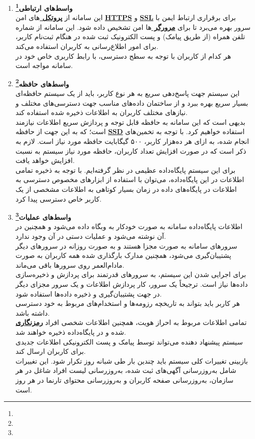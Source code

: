 \documentclass[12pt]{article}
\begin{document}
\begin{enumerate}
		\item
		\textbf{واسط‌های ارتباطی\footnote{}}\\
		این سامانه از \textbf{\hyperref[ref:protocol]{پروتکل }}‌های امن \textbf{\hyperref[ref:https]{HTTPS}} و \textbf{\hyperref[ref:ssl]{SSL}} برای برقراری ارتباط ایمن با سرور بهره می‌برد تا برای \textbf{\hyperref[ref:browser]{مرورگر }}ها امن تشخیص داده شود. این سامانه از شماره تلفن همراه (از طریق پیامک) و پست الکترونیک ثبت شده در هنگام ثبت‌نام کاربر، برای امور اطلاع‌‌رسانی به کاربران استفاده می‌کند.\\
		هر کدام از کاربران با توجه به سطح دسترسی، با رابط کاربری خاص خود در سامانه مواجه است.

		\item
		\textbf{واسط‌های حافظه\footnote{}}\\
		این سیستم جهت پاسخ‌دهی سریع به هر نوع کاربر، باید از یک سیستم حافظه‌ای بسیار سریع بهره ببرد و از ساختمان داده‌های مناسب جهت دسترسی‌های مختلف و نیازهای مختلف کاربران به اطلاعات ذخیره شده استفاده کند.\\
		بدیهی است که این سامانه به حافظه قابل توجه و پردازش سريع اطلاعات نیازمند است؛ که به این جهت از حافظه \textbf{\hyperref[ref:ssd]{SSD}} استفاده خواهیم کرد. با توجه به تخمین‌های انجام شده، به ازای هر ده‌هزار کاربر، ۵۰۰ گیگابایت حافظه مورد نیاز است. لازم به ذکر است که در صورت افزایش تعداد کاربران، حافظه‌ مورد نیاز سیستم به نسبت افزایش خواهد یافت.\\
		برای این سیستم پایگاه‌داده عظیمی در نظر گرفته‌ایم. با توجه به ذخیره تمامی اطلاعات در این پایگاه‌‌داده، می‌توان با استفاده از ابزار‌های مخصوص دسترسی به اطلاعات در پایگاه‌های داده در زمان بسیار کوتاهی به اطلاعات مشخصی از یک کاربر خاص دسترسی پیدا کرد.
		\item
		\textbf{واسط‌های عملیات\footnote{}}\\
		اطلاعات پایگاه‌داده سامانه به صورت خودکار به وبگاه داده می‌شود و همچنین در آن نوشته می‌شود و عملیات دستی در آن وجود ندارد.\\
		سرورهای سامانه به صورت مجزا هستند و به صورت روزانه در سرورهای دیگر پشتیبان‌گیری می‌شود، همچنین مدارک بارگذاری شده همه کاربران به صورت مادام‌العمر روی سرور‌ها باقی می‌ماند.\\
		برای اجرایی شدن این سیستم، به سرورهای قدرتمند برای پردازش و ذخیره‌سازی داده‌ها نیاز است. ترجیحاً یک سرور، کار پردازش اطلاعات و یک سرور مجزای دیگر در جهت پشتیبان‌گیری و ذخیره داده‌ها استفاده شود.\\
		هر کاربر باید بتواند به تاریخچه رزومه‌ها و استخدام‌های مربوط به خود دسترسی داشته باشد.\\
		تمامی اطلاعات مربوط به احراز هویت، همچنین اطلاعات شخصی افراد \textbf{\hyperref[ref:enc]{رمزنگاری}} شده و در پایگاه‌داده ذخیره خواهند شد.\\
		سیستم پیشنهاد دهنده می‌تواند توسط پیامک و پست الکترونیکی اطلاعات جدیدی برای کاربران ارسال کند.\\
		بازبینی تغییرات کلی سیستم باید چندین بار طی شبانه روز تکرار شود. این تغییرات شامل به‌روزرسانی آگهی‌های ثبت شده، به‌روزرسانی لیست افراد شاغل در هر سازمان، به‌روزرسانی صفحه کاربران و به‌روزرسانی محتوای تارنما در هر روز است.


\end{enumerate}
\end{document}
